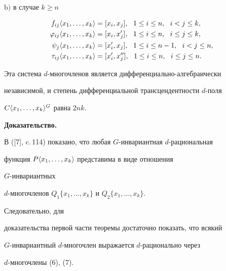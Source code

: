 \begin{thm}
$\mathrm b)$ в случае $k\ge n$


\begin{equation}


\begin{split}


f_{i j}\la x_1,\dotsc,x_k\ra &=[x_i, x_j],\ \ 1\le i\le n,


\ \ i< j \le k,\\


\varphi_{i j}\la x_1,\dotsc,x_k\ra&=[x_i, x'_j],


\ \ 1\le i\le n,\ \ i\le j\le k, \\


\psi_j\la x_1,\dotsc,x_k\ra &=[x'_i, x_j],


\ \ 1\le i\le n-1,\ \ i<j\le n,\\


\tau_{i j}\la x_1,\dotsc,x_k\ra &=[x'_i, x''_j],


\ \ 1\le i\le n,\ \ i\le j\le n.


\end{split}


\end{equation}





Эта система $d$-многочленов является дифференциально-алгебраически 


независимой, и степень дифференциальной трансцендентности $d$-поля


$C\langle x_1,\dotsc,x_k\rangle^G$ равна $2nk$.


\end{thm}





{\bf Доказательство.} 


В ([7], c.\,114) показано, что любая $G$-инвариантная $d$-рациональная 


функция $P\langle x_1,\dotsc,x_k\rangle$ представима в виде отношения 


$G$-инвариантных 


$d$-многочленов $Q_1\{x_1,\dotsc,x_k\}$ и $Q_2\{x_1,\dotsc,x_k\}$.


Следовательно, для


доказательства первой части теоремы достаточно показать, что всякий 


$G$-инвариантный $d$-многочлен выражается $d$-рационально через 


$d$-многочлены (6), (7). 





